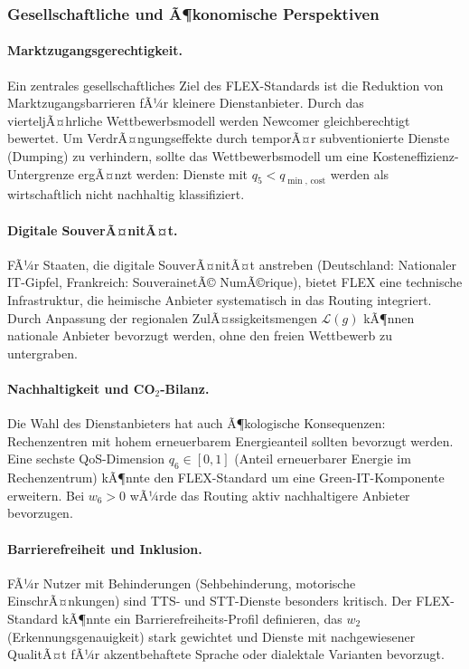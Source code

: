 ﻿\documentclass[a4paper,12pt]{article}
\theoremstyle{definition}
\begin{document}
\subsubsection{Gesellschaftliche und Ã¶konomische Perspektiven}

\paragraph{Marktzugangsgerechtigkeit.}
Ein zentrales gesellschaftliches Ziel des FLEX-Standards ist die Reduktion von Marktzugangsbarrieren fÃ¼r kleinere Dienstanbieter. Durch das vierteljÃ¤hrliche Wettbewerbsmodell werden Newcomer gleichberechtigt bewertet. Um VerdrÃ¤ngungs\-effekte durch temporÃ¤r subventionierte Dienste (Dumping) zu verhindern, sollte das Wettbewerbsmodell um eine Kosteneffizienz-Untergrenze ergÃ¤nzt werden: Dienste mit $q_5 < q_{\min,\,\mathrm{cost}}$ werden als wirtschaftlich nicht nachhaltig klassifiziert.

\paragraph{Digitale SouverÃ¤nitÃ¤t.}
FÃ¼r Staaten, die digitale SouverÃ¤nitÃ¤t anstreben (Deutschland: Nationaler IT-Gipfel, Frankreich: SouverainetÃ© NumÃ©rique), bietet FLEX eine technische Infrastruktur, die heimische Anbieter systematisch in das Routing integriert. Durch Anpassung der regionalen ZulÃ¤ssigkeitsmengen $\mathcal{L}(g)$ kÃ¶nnen nationale Anbieter bevorzugt werden, ohne den freien Wettbewerb zu untergraben.

\paragraph{Nachhaltigkeit und CO$_2$-Bilanz.}
Die Wahl des Dienstanbieters hat auch Ã¶kologische Konsequenzen: Rechenzentren mit hohem erneuerbarem Energieanteil sollten bevorzugt werden. Eine sechste QoS-Dimension $q_6 \in [0,1]$ (Anteil erneuerbarer Energie im Rechenzentrum) kÃ¶nnte den FLEX-Standard um eine Green-IT-Komponente erweitern. Bei $w_6 > 0$ wÃ¼rde das Routing aktiv nachhaltigere Anbieter bevorzugen.

\paragraph{Barrierefreiheit und Inklusion.}
FÃ¼r Nutzer mit Behinderungen (Sehbehinderung, motorische EinschrÃ¤nkungen) sind TTS- und STT-Dienste besonders kritisch. Der FLEX-Standard kÃ¶nnte ein Barrierefreiheits-Profil definieren, das $w_2$ (Erkennungsgenauigkeit) stark gewichtet und Dienste mit nachgewiesener QualitÃ¤t fÃ¼r akzentbehaftete Sprache oder dialektale Varianten bevorzugt.
\end{document}
